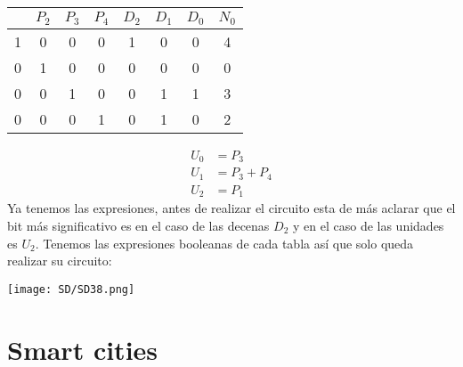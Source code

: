 \documentclass[11pt,fleqn]{book} %
\begin{document}
\begin{exercise}
\begin{center}
\begin{tabular}{|cccc|ccc|c|}
\rowcolor{ocre!50}
\multicolumn{1}{|c|}{$P_1$}                    & \multicolumn{1}{c|}{$P_2$}                    & \multicolumn{1}{c|}{$P_3$}                    & $P_4$                    & \multicolumn{1}{c|}{$D_2$} & \multicolumn{1}{c|}{$D_1$} & $D_0$ & $N_0$ \\ \hline
\multicolumn{1}{|c|}{{\color[HTML]{FE0000} 1}} & \multicolumn{1}{c|}{0}                        & \multicolumn{1}{c|}{0}                        & 0                        & \multicolumn{1}{c|}{1}     & \multicolumn{1}{c|}{0}     & 0     & 4     \\ \hline
\multicolumn{1}{|c|}{0}                        & \multicolumn{1}{c|}{{\color[HTML]{FE0000} 1}} & \multicolumn{1}{c|}{0}                        & 0                        & \multicolumn{1}{c|}{0}     & \multicolumn{1}{c|}{0}     & 0     & 0     \\ \hline
\multicolumn{1}{|c|}{0}                        & \multicolumn{1}{c|}{0}                        & \multicolumn{1}{c|}{{\color[HTML]{FE0000} 1}} & 0                        & \multicolumn{1}{c|}{0}     & \multicolumn{1}{c|}{1}     & 1     & 3     \\ \hline
\multicolumn{1}{|c|}{0}                        & \multicolumn{1}{c|}{0}                        & \multicolumn{1}{c|}{0}                        & {\color[HTML]{FE0000} 1} & \multicolumn{1}{c|}{0}     & \multicolumn{1}{c|}{1}     & 0     & 2     \\ \hline
\end{tabular}
\end{center}
\begin{align*}
U_0&=P_3\\
U_1&=P_3 + P_4\\
U_2&=P_1
\end{align*}Ya tenemos las expresiones, antes de realizar el circuito esta de más aclarar que el bit más significativo es en el caso de las decenas $D_2$ y en el caso de las unidades es $U_2$. Tenemos las expresiones booleanas de cada tabla así que solo queda realizar su circuito:\\
\begin{center}
\texttt{[image: SD/SD38.png]}
\end{center}
\end{exercise}

\part{Smart cities}
\end{document}
